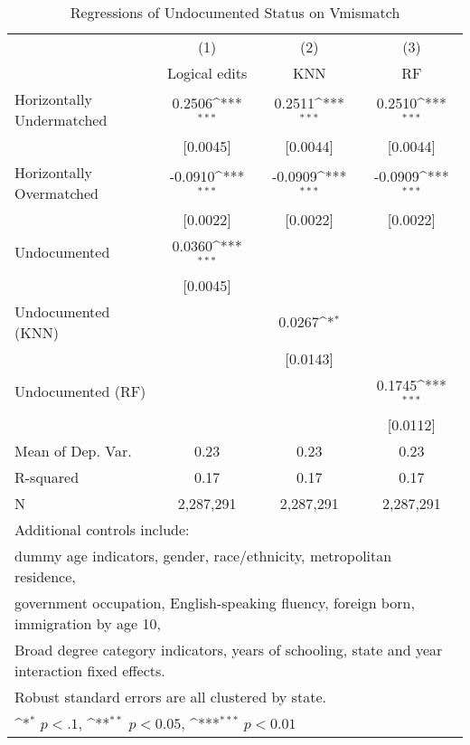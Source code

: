 \begin{table}[htbp]\centering
\def\sym#1{\ifmmode^{#1}\else\(^{#1}\)\fi}
\caption{Regressions of Undocumented Status on Vmismatch}
\begin{tabular}{l*{3}{c}}
\toprule
                    &\multicolumn{1}{c}{(1)}         &\multicolumn{1}{c}{(2)}         &\multicolumn{1}{c}{(3)}         \\
                    &Logical edits         &         KNN         &          RF         \\
\midrule
Horizontally Undermatched&      0.2506\sym{***}&      0.2511\sym{***}&      0.2510\sym{***}\\
                    &    [0.0045]         &    [0.0044]         &    [0.0044]         \\
\addlinespace
Horizontally Overmatched&     -0.0910\sym{***}&     -0.0909\sym{***}&     -0.0909\sym{***}\\
                    &    [0.0022]         &    [0.0022]         &    [0.0022]         \\
\addlinespace
Undocumented        &      0.0360\sym{***}&                     &                     \\
                    &    [0.0045]         &                     &                     \\
\addlinespace
Undocumented (KNN)  &                     &      0.0267\sym{*}  &                     \\
                    &                     &    [0.0143]         &                     \\
\addlinespace
Undocumented (RF)   &                     &                     &      0.1745\sym{***}\\
                    &                     &                     &    [0.0112]         \\
\midrule
Mean of Dep. Var.   &        0.23         &        0.23         &        0.23         \\
R-squared           &        0.17         &        0.17         &        0.17         \\
N                   &   2,287,291         &   2,287,291         &   2,287,291         \\
\bottomrule
\multicolumn{4}{l}{\footnotesize Additional controls include:}\\
\multicolumn{4}{l}{\footnotesize dummy age indicators, gender, race/ethnicity, metropolitan residence,}\\
\multicolumn{4}{l}{\footnotesize government occupation, English-speaking fluency, foreign born, immigration by age 10,}\\
\multicolumn{4}{l}{\footnotesize Broad degree category indicators, years of schooling, state and year interaction fixed effects.}\\
\multicolumn{4}{l}{\footnotesize Robust standard errors are all clustered by state.}\\
\multicolumn{4}{l}{\footnotesize \sym{*} \(p<.1\), \sym{**} \(p<0.05\), \sym{***} \(p<0.01\)}\\
\end{tabular}
\end{table}
